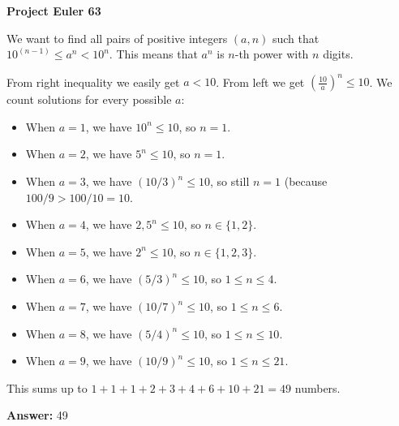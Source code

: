 \documentclass[a4paper,12pt]{article}
\begin{document}
\setlength\parindent{0pt}
\textbf{Project Euler 63}
\vspace{5ex}


We want to find all pairs of positive integers \((a, n)\)
such that \(10^{(n - 1)} \leq a^n < 10^n\).
This means that \(a^n\) is \(n\)-th power with \(n\) digits.

From right inequality we easily get \(a < 10\). From left we get
\(\left(\frac{10}{a}\right)^n \leq 10\). We count solutions for every possible \(a\):

\begin{itemize}
\item When \(a = 1\), we have \(10^n \leq 10\), so \(n = 1\). 
\item When \(a = 2\), we have \(5^n \leq 10\), so \(n = 1\). 
\item When \(a = 3\), we have \((10/3)^n \leq 10\), so still \(n = 1\)
(because \(100/9 > 100/10 = 10\). 
\item When \(a = 4\), we have \(2{,}5^n \leq 10\), so \(n \in \{1, 2\}\). 
\item When \(a = 5\), we have \(2^n \leq 10\), so \(n \in \{1, 2, 3\}\). 
\item When \(a = 6\), we have \((5/3)^n \leq 10\), so \(1 \leq n \leq 4\). 
\item When \(a = 7\), we have \((10/7)^n \leq 10\), so \(1 \leq n \leq 6\). 
\item When \(a = 8\), we have \((5/4)^n \leq 10\), so \(1 \leq n \leq 10\). 
\item When \(a = 9\), we have \((10/9)^n \leq 10\), so \(1 \leq n \leq 21\). 
\end{itemize}

This sums up to \(1 + 1 + 1 + 2 + 3 + 4 + 6 + 10 + 21 = 49\) numbers.

\vspace{5ex}
\textbf{Answer:}
49
\end{document}
